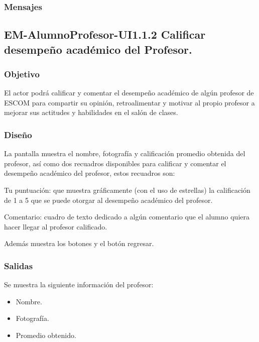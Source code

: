\subsubsection{Mensajes}
	\noindent


\newpage

\subsection{EM-AlumnoProfesor-UI1.1.2 Calificar desempeño académico del Profesor.}

\subsubsection{Objetivo}
	\noindent
	El actor podrá calificar y comentar el desempeño académico de algún profesor de ESCOM para compartir su opinión, retroalimentar y motivar al propio profesor a mejorar sus actitudes y habilidades en el salón de clases.

\subsubsection{Diseño}
	\noindent
	La pantalla muestra el nombre, fotografía y calificación promedio obtenida del profesor, así como dos recuadros disponibles para calificar y comentar el desempeño académico del profesor, estos recuadros son:
	\begin{Citemize}
		\item Tu puntuación: que muestra gráficamente (con el uso de estrellas) la calificación de 1 a 5 que se puede otorgar al desempeño académico del profesor.
		\item Comentario: cuadro de texto dedicado a algún comentario que el alumno quiera hacer llegar al profesor calificado. 
	\end{Citemize}
	Además muestra los botones  y el botón regresar.

\pagebreak
{}

\subsubsection{Salidas}
	\noindent
	Se muestra la siguiente información del profesor:
	\begin{itemize} 
		\item Nombre.
		\item Fotografía.
		\item Promedio obtenido.
	\end{itemize}

